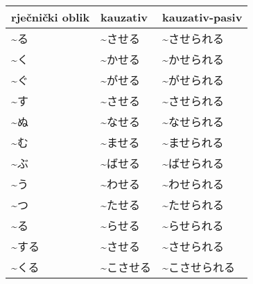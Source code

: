 	\begin{table}[h]
		\centering
		\begin{tabular}{l | l | l}\toprule[2pt]
			rječnički oblik & kauzativ & kauzativ-pasiv\\
			\midrule
			\textasciitilde る & \textasciitilde させる & \textasciitilde させられる\\
			\textasciitilde く & \textasciitilde かせる & \textasciitilde かせられる\\
			\textasciitilde ぐ & \textasciitilde がせる & \textasciitilde がせられる\\
			\textasciitilde す & \textasciitilde させる & \textasciitilde させられる\\
			\textasciitilde ぬ & \textasciitilde なせる & \textasciitilde なせられる\\
			\textasciitilde む & \textasciitilde ませる & \textasciitilde ませられる\\
			\textasciitilde ぶ & \textasciitilde ばせる & \textasciitilde ばせられる\\
			\textasciitilde う & \textasciitilde わせる & \textasciitilde わせられる\\
			\textasciitilde つ & \textasciitilde たせる & \textasciitilde たせられる\\
			\textasciitilde る & \textasciitilde らせる & \textasciitilde らせられる\\
			\textasciitilde する　& \textasciitilde させる & \textasciitilde させられる\\
			\textasciitilde くる　&\textasciitilde こさせる & \textasciitilde こさせられる\\
			\bottomrule[2pt]
		\end{tabular}
	\end{table}

	

